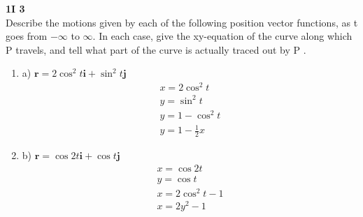 \documentclass[11pt]{article}
\begin{document}
    \begin{problem}
        \textbf{1I 3}\\
        Describe the motions given by each of the following position vector functions, as t goes from $-\infty$ to $\infty$. In each case, give the xy-equation of the curve along which P travels, and tell what part of the curve is actually traced out by P .\\
        \begin{enumerate}
            \item a) $\mathbf { r } = 2 \cos ^ { 2 } t \mathbf { i } + \sin ^ { 2 } t \mathbf { j }$\\
            \begin{gather*}
                x = 2\cos^2{t}\\
                y = \sin^2{t}\\
                y = 1 - \cos^2 {t} \\
                y = 1 - \frac{1}{2} x
            \end{gather*}
            \item b) $\mathbf { r } = \cos 2 t \mathbf { i } + \cos t \mathbf { j }$\\
            \begin{gather*}
                x = \cos{2t} \\
                y = \cos{t} \\
                x = 2\cos^2 {t} - 1\\
                x = 2y^2 - 1
            \end{gather*}
        \end{enumerate}
    \end{problem}
\end{document}
